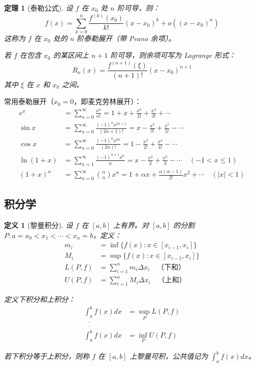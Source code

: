 \documentclass[12pt]{article}
\newtheorem{theorem}{定理}[section]
\newtheorem{definition}{定义}[section]
\begin{document}
\begin{theorem}[泰勒公式]
设 $f$ 在 $x_0$ 处 $n$ 阶可导，则：
$$f(x) = \sum_{k=0}^{n} \frac{f^{(k)}(x_0)}{k!}(x - x_0)^k + o((x - x_0)^n)$$
这称为 $f$ 在 $x_0$ 处的 $n$ 阶泰勒展开（带 Peano 余项）。

若 $f$ 在包含 $x_0$ 的某区间上 $n+1$ 阶可导，则余项可写为 Lagrange 形式：
$$R_n(x) = \frac{f^{(n+1)}(\xi)}{(n+1)!}(x - x_0)^{n+1}$$
其中 $\xi$ 在 $x$ 和 $x_0$ 之间。
\end{theorem}

常用泰勒展开（$x_0 = 0$，即麦克劳林展开）：
\begin{align}
e^x &= \sum_{n=0}^{\infty} \frac{x^n}{n!} = 1 + x + \frac{x^2}{2!} + \frac{x^3}{3!} + \cdots \\
\sin x &= \sum_{n=0}^{\infty} \frac{(-1)^n x^{2n+1}}{(2n+1)!} = x - \frac{x^3}{3!} + \frac{x^5}{5!} - \cdots \\
\cos x &= \sum_{n=0}^{\infty} \frac{(-1)^n x^{2n}}{(2n)!} = 1 - \frac{x^2}{2!} + \frac{x^4}{4!} - \cdots \\
\ln(1+x) &= \sum_{n=1}^{\infty} \frac{(-1)^{n+1} x^n}{n} = x - \frac{x^2}{2} + \frac{x^3}{3} - \cdots \quad (-1 < x \leq 1) \\
(1+x)^\alpha &= \sum_{n=0}^{\infty} \binom{\alpha}{n} x^n = 1 + \alpha x + \frac{\alpha(\alpha-1)}{2!}x^2 + \cdots \quad (|x| < 1)
\end{align}

\subsection{积分学}

\begin{definition}[黎曼积分]
设 $f$ 在 $[a, b]$ 上有界。对 $[a, b]$ 的分割 $P: a = x_0 < x_1 < \cdots < x_n = b$，定义：
\begin{align}
m_i &= \inf\{f(x) : x \in [x_{i-1}, x_i]\} \\
M_i &= \sup\{f(x) : x \in [x_{i-1}, x_i]\} \\
L(P, f) &= \sum_{i=1}^{n} m_i \Delta x_i \quad \text{（下和）} \\
U(P, f) &= \sum_{i=1}^{n} M_i \Delta x_i \quad \text{（上和）}
\end{align}

定义下积分和上积分：
\begin{align}
\underline{\int_a^b} f(x) dx &= \sup_P L(P, f) \\
\overline{\int_a^b} f(x) dx &= \inf_P U(P, f)
\end{align}

若下积分等于上积分，则称 $f$ 在 $[a, b]$ 上黎曼可积，公共值记为 $\int_a^b f(x) dx$。
\end{definition}
\end{document}
